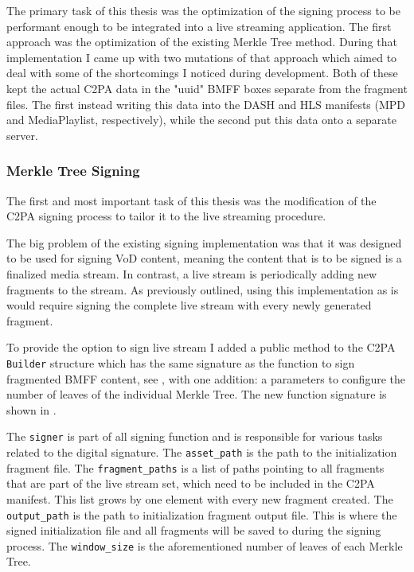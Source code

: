 The primary task of this thesis was the optimization of the signing process to be performant enough to be integrated into a live streaming application. The first approach was the optimization of the existing Merkle Tree method. During that implementation I came up with two mutations of that approach which aimed to deal with some of the shortcomings I noticed during development. Both of these kept the actual C2PA data in the "uuid" BMFF boxes separate from the fragment files. The first instead writing this data into the DASH and HLS manifests (MPD and MediaPlaylist, respectively), while the second put this data onto a separate server.

\subsubsection{Merkle Tree Signing\label{sec:merkle_opt}}

The first and most important task of this thesis was the modification of the C2PA signing process to tailor it to the live streaming procedure.

The big problem of the existing signing implementation was that it was designed to be used for signing VoD content, meaning the content that is to be signed is a finalized media stream. In contrast, a live stream is periodically adding new fragments to the stream. As previously outlined, using this implementation as is would require signing the complete live stream with every newly generated fragment.

To provide the option to sign live stream I added a public method to the C2PA \texttt{Builder} structure which has the same signature as the function to sign fragmented BMFF content, see , with one addition: a parameters to configure the number of leaves of the individual Merkle Tree. The new function signature is shown in .

The \texttt{signer} is part of all signing function and is responsible for various tasks related to the digital signature. The \texttt{asset\_path} is the path to the initialization fragment file. The \texttt{fragment\_paths} is a list of paths pointing to all fragments that are part of the live stream set, which need to be included in the C2PA manifest. This list grows by one element with every new fragment created. The \texttt{output\_path} is the path to initialization fragment output file. This is where the signed initialization file and all fragments will be saved to during the signing process. The \texttt{window\_size} is the aforementioned number of leaves of each Merkle Tree. 

